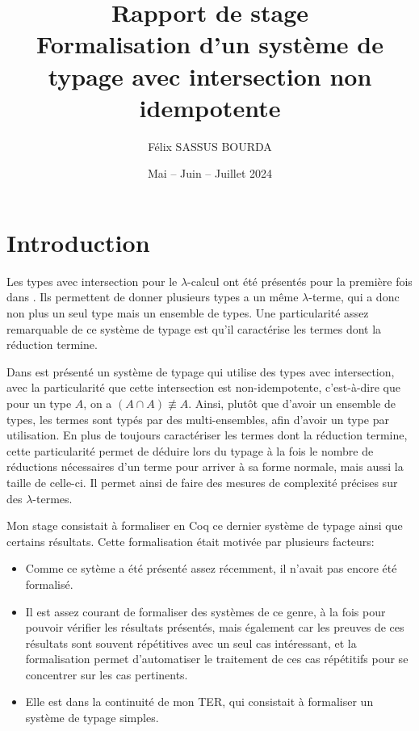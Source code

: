 \documentclass[10pt]{article}
\author{Félix SASSUS BOURDA}
\title{
    Rapport de stage \\ 
    Formalisation d'un système de typage avec intersection non idempotente
}
\date{
  Mai -- Juin -- Juillet 2024
}
\begin{document}
\large
\maketitle
\tableofcontents

\newpage

\section{Introduction}
Les types avec intersection pour le $\lambda$-calcul ont été présentés pour la première fois dans \cite{inter-types}. Ils permettent de donner plusieurs types a un même $\lambda$-terme, qui a donc non plus un seul type mais un ensemble de types. Une particularité assez remarquable de ce système de typage est qu'il caractérise les termes dont la réduction termine. 

Dans \cite{tight-typing-and-split-bounds} est présenté un système de typage qui utilise des types avec intersection, avec la particularité que cette intersection est non-idempotente, c'est-à-dire que pour un type $A$, on a $(A \cap A) \not\equiv A$. Ainsi, plutôt que d'avoir un ensemble de types, les termes sont typés par des multi-ensembles, afin d'avoir un type par utilisation. En plus de toujours caractériser les termes dont la réduction termine, cette particularité permet de déduire lors du typage à la fois le nombre de réductions nécessaires d'un terme pour arriver à sa forme normale, mais aussi la taille de celle-ci. Il permet ainsi de faire des mesures de complexité précises sur des $\lambda$-termes.

Mon stage consistait à formaliser en Coq ce dernier système de typage ainsi que certains résultats. Cette formalisation était motivée par plusieurs facteurs:
\begin{itemize}
  \item Comme ce sytème a été présenté assez récemment, il n'avait pas encore été formalisé.
  \item Il est assez courant de formaliser des systèmes de ce genre, à la fois pour pouvoir vérifier les résultats présentés, mais également car les preuves de ces résultats sont souvent répétitives avec un seul cas intéressant, et la formalisation permet d'automatiser le traitement de ces cas répétitifs pour se concentrer sur les cas pertinents.
  \item Elle est dans la continuité de mon TER, qui consistait à formaliser un système de typage simples.
\end{itemize} 
\end{document}
